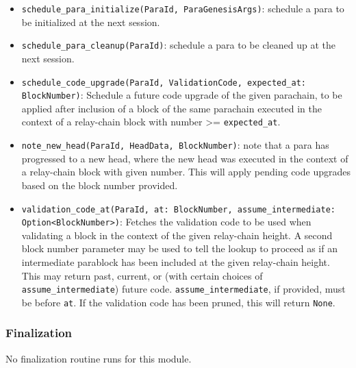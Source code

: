 \begin{itemize}
    \item \verb|schedule_para_initialize(ParaId, ParaGenesisArgs)|: schedule a
    para to be initialized at the next session.
    \item \verb|schedule_para_cleanup(ParaId)|: schedule a para to be cleaned up
    at the next session.
    \item \verb|schedule_code_upgrade(ParaId, ValidationCode, expected_at: BlockNumber)|:
    Schedule a future code upgrade of the given parachain, to be
    applied after inclusion of a block of the same parachain executed in the
    context of a relay-chain block with number >= \verb|expected_at|.
    \item \verb|note_new_head(ParaId, HeadData, BlockNumber)|: note that a para
    has progressed to a new head, where the new head was executed in the context
    of a relay-chain block with given number. This will apply pending code
    upgrades based on the block number provided.
    \item \verb|validation_code_at(ParaId, at: BlockNumber, assume_intermediate: Option<BlockNumber>)|:
    Fetches the validation code to be used when
    validating a block in the context of the given relay-chain height. A second
    block number parameter may be used to tell the lookup to proceed as if an
    intermediate parablock has been included at the given relay-chain height.
    This may return past, current, or (with certain choices of
    \verb|assume_intermediate|) future code. \verb|assume_intermediate|, if
    provided, must be before \verb|at|. If the validation code has been pruned,
    this will return \verb|None|.
\end{itemize}

\subsubsection{Finalization}

No finalization routine runs for this module.
